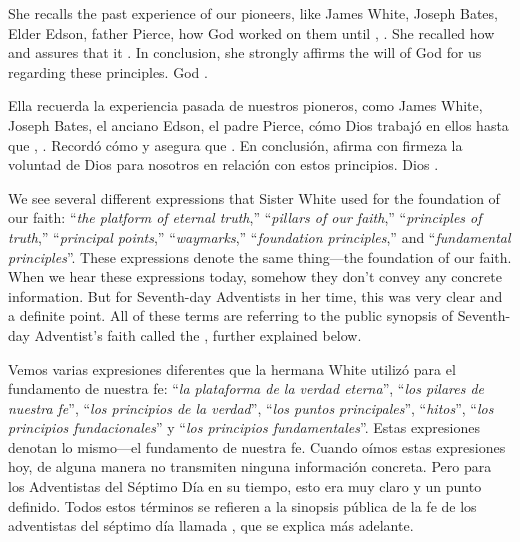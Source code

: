 She recalls the past experience of our pioneers, like James White, Joseph Bates, Elder Edson, father Pierce, how God worked on them until , . She recalled how  and assures that it . In conclusion, she strongly affirms the will of God for us regarding these principles. God .


Ella recuerda la experiencia pasada de nuestros pioneros, como James White, Joseph Bates, el anciano Edson, el padre Pierce, cómo Dios trabajó en ellos hasta que , . Recordó cómo  y asegura que . En conclusión, afirma con firmeza la voluntad de Dios para nosotros en relación con estos principios. Dios .


We see several different expressions that Sister White used for the foundation of our faith: “\textit{the platform of eternal truth},” “\textit{pillars of our faith},” “\textit{principles of truth},” “\textit{principal points},” “\textit{waymarks},” “\textit{foundation principles},” and “\textit{fundamental principles}”. These expressions denote the same thing—the foundation of our faith. When we hear these expressions today, somehow they don’t convey any concrete information. But for Seventh-day Adventists in her time, this was very clear and a definite point. All of these terms are referring to the public synopsis of Seventh-day Adventist’s faith called the , further explained below.


Vemos varias expresiones diferentes que la hermana White utilizó para el fundamento de nuestra fe: “\textit{la plataforma de la verdad eterna}”, “\textit{los pilares de nuestra fe}”, “\textit{los principios de la verdad}”, “\textit{los puntos principales}”, “\textit{hitos}”, “\textit{los principios fundacionales}” y “\textit{los principios fundamentales}”. Estas expresiones denotan lo mismo—el fundamento de nuestra fe. Cuando oímos estas expresiones hoy, de alguna manera no transmiten ninguna información concreta. Pero para los Adventistas del Séptimo Día en su tiempo, esto era muy claro y un punto definido. Todos estos términos se refieren a la sinopsis pública de la fe de los adventistas del séptimo día llamada , que se explica más adelante.


